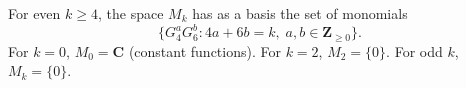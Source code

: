 For even $k \geq 4$, the space $M_k$ has as a basis the set of monomials
$$
\{G_4^a G_6^b : 4a + 6b = k, \; a, b \in \mathbf{Z}_{\geq 0}\}.
$$
For $k=0$, $M_0 = \mathbf{C}$ (constant functions). For $k=2$, $M_2 = \{0\}$. For odd $k$, $M_k = \{0\}$.
